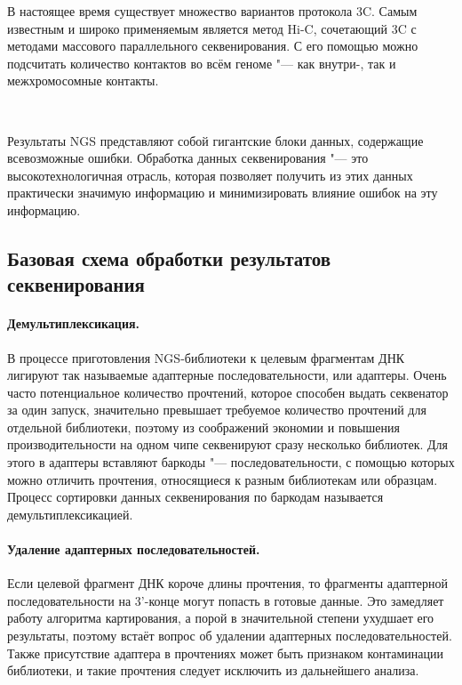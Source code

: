 \documentclass[a4paper,12pt]{article}
\begin{document}
В настоящее время существует множество вариантов протокола 3C.
Самым известным и широко применяемым является метод Hi-C, сочетающий 3C с методами массового параллельного секвенирования.
С его помощью можно подсчитать количество контактов во всём геноме "--- как внутри-, так и межхромосомные контакты\cite{oluwadare}.

~

Результаты NGS представляют собой гигантские блоки данных, содержащие всевозможные ошибки.
Обработка данных секвенирования "--- это высокотехнологичная отрасль, которая позволяет получить из этих данных практически значимую информацию и минимизировать влияние ошибок на эту информацию.

\subsection{Базовая схема обработки результатов секвенирования}

\paragraph{Демультиплексикация.}
В процессе приготовления NGS-библиотеки к целевым фрагментам ДНК лигируют так называемые адаптерные последовательности, или адаптеры.
Очень часто потенциальное количество прочтений, которое способен выдать секвенатор за один запуск, значительно превышает требуемое количество прочтений для отдельной библиотеки, поэтому из соображений экономии и повышения производительности на одном чипе секвенируют сразу несколько библиотек.
Для этого в адаптеры вставляют баркоды "--- последовательности, с помощью которых можно отличить прочтения, относящиеся к разным библиотекам или образцам.
Процесс сортировки данных секвенирования по баркодам называется демультиплексикацией.

\paragraph{Удаление адаптерных последовательностей.}
Если целевой фрагмент ДНК короче длины прочтения, то фрагменты адаптерной последовательности на 3'-конце могут попасть в готовые данные.
Это замедляет работу алгоритма картирования, а порой в значительной степени ухудшает его результаты, поэтому встаёт вопрос об удалении адаптерных последовательностей.
Также присутствие адаптера в прочтениях может быть признаком контаминации библиотеки, и такие прочтения следует исключить из дальнейшего анализа\cite{cutadapt}.
\end{document}
